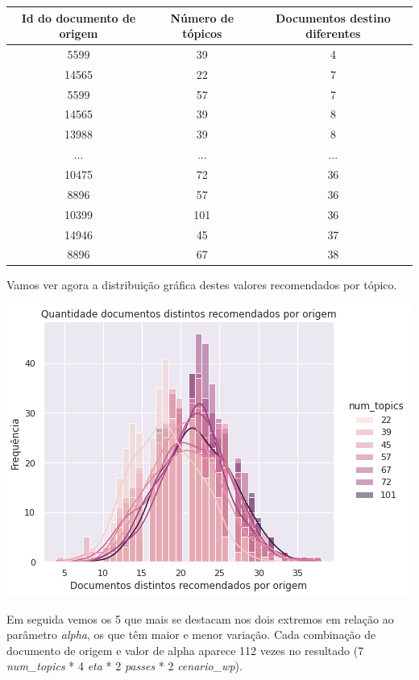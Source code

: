 \begin{center}
    \begin{tabular}{|c|c|c|}
        \hline
        \textbf{Id do documento de origem} & \textbf{Número de tópicos} & \textbf{Documentos destino diferentes} \\
        \hline
        5599 & 39 & 4 \\
        \hline
        14565 & 22 & 7 \\
        \hline
        5599 & 57 & 7 \\
        \hline
        14565 & 39 & 8 \\
        \hline
        13988 & 39 & 8 \\
        \hline
        ... & ... & ... \\
        \hline
        10475 & 72 & 36 \\
        \hline
        8896 & 57 & 36 \\
        \hline
        10399 & 101 & 36 \\
        \hline
        14946 & 45 & 37 \\
        \hline
        8896 & 67 & 38 \\
        \hline
    \end{tabular}
\end{center}

Vamos ver agora a distribuição gráfica destes valores recomendados por tópico.

\includegraphics[scale=0.7]{resultados/resources/distribuicao_semelhantes_distintos_topics.png}

Em seguida vemos os 5 que mais se destacam nos dois extremos em relação ao parâmetro \textit{alpha}, os que têm maior e menor variação. 
Cada combinação de documento de origem e valor de alpha aparece 112 vezes no resultado (7 \textit{num\_topics} * 4 \textit{eta} * 2 \textit{passes} * 2 \textit{cenario\_wp}).

